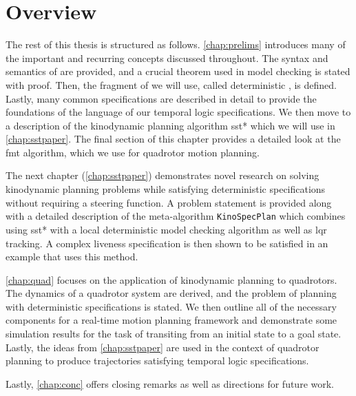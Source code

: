 \section{Overview}

The rest of this thesis is structured as follows. \autoref{chap:prelims} introduces many of the important and recurring concepts discussed throughout. The syntax and semantics of \mucalc{} are provided, and a crucial theorem used in model checking is stated with proof. Then, the fragment of \mucalc{} we will use, called deterministic \mucalc{}, is defined. Lastly, many common specifications are described in detail to provide the foundations of the language of our temporal logic specifications. We then move to a description of the kinodynamic planning algorithm \gls{sst}* which we will use in \autoref{chap:sstpaper}. The final section of this chapter provides a detailed look at the \gls{fmt} algorithm, which we use for quadrotor motion planning.

The next chapter (\autoref{chap:sstpaper}) demonstrates novel research on solving kinodynamic planning problems while satisfying deterministic \mucalc{} specifications without requiring a steering function. A problem statement is provided along with a detailed description of the meta-algorithm \texttt{KinoSpecPlan} which combines using \gls{sst}* with a local deterministic model checking algorithm as well as \gls{lqr} tracking. A complex liveness specification is then shown to be satisfied in an example that uses this method.

\autoref{chap:quad} focuses on the application of kinodynamic planning to quadrotors. The dynamics of a quadrotor system are derived, and the problem of planning with deterministic \mucalc{} specifications is stated. We then outline all of the necessary components for a real-time motion planning framework and demonstrate some simulation results for the task of transiting from an initial state to a goal state. Lastly, the ideas from \autoref{chap:sstpaper} are used in the context of quadrotor planning to produce trajectories satisfying temporal logic specifications.

Lastly, \autoref{chap:conc} offers closing remarks as well as directions for future work.
